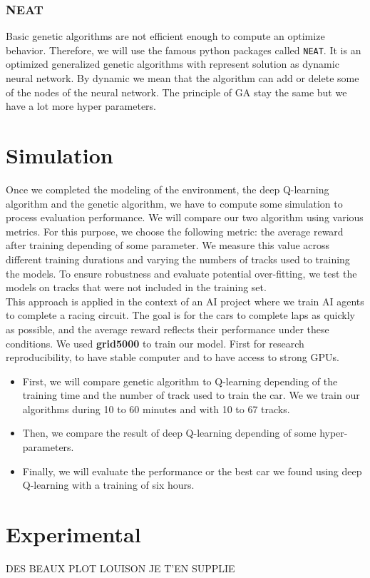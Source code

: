 \documentclass[11pt,a4paper]{article}
\newcommand{\mlist}[1]{\begin{itemize}[noitemsep,topsep=0pt]#1\end{itemize}}
\begin{document}
			\subsubsection*{NEAT}
Basic genetic algorithms are not efficient enough to compute an optimize behavior. Therefore, we will use the famous python packages called \texttt{NEAT}. It is an optimized generalized genetic algorithms with represent solution as dynamic neural network. By dynamic we mean that the algorithm can add or delete some of the nodes of the neural network. The principle of GA stay the same but we have a lot more hyper parameters.
	
	
	\section*{Simulation}
Once we completed the modeling of the environment, the deep Q-learning algorithm and the genetic algorithm, we have to compute some simulation to process evaluation performance. We will compare our two algorithm using various metrics. For this purpose, we choose the following metric: the average reward after training depending of some parameter. We measure this value across different training durations and varying the numbers of tracks used to training the models. To ensure robustness and evaluate potential over-fitting, we test the models on tracks that were not included in the training set.\\
This approach is applied in the context of an AI project where we train AI agents to complete a racing circuit. The goal is for the cars to complete laps as quickly as possible, and the average reward reflects their performance under these conditions. We used \textbf{grid5000} to train our model. First for research reproducibility, to have stable computer and to have access to strong GPUs.
\mlist{
\item First, we will compare genetic algorithm to Q-learning depending of the training time and the number of track used to train the car. We we train our algorithms during 10 to 60 minutes and with 10 to 67 tracks.
\item Then, we compare the result of deep Q-learning depending of some hyper-parameters.
\item Finally, we will evaluate the performance or the best car we found using deep Q-learning with a training of six hours.
}

    \section*{Experimental}
DES BEAUX PLOT LOUISON JE T'EN SUPPLIE
\end{document}
